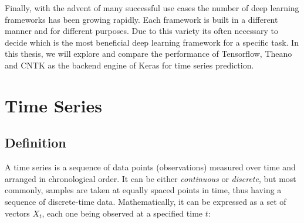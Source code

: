 \documentclass[a4paper, 12pt]{article}
\numberwithin{equation}{section}
\numberwithin{figure}{section}
\numberwithin{table}{section}
\begin{document}
	Finally, with the advent of many successful use cases the number of deep learning frameworks has been growing rapidly. Each framework is built in a different manner and for different purposes. Due to this variety its often necessary to decide which is the most beneficial deep learning framework for a specific task. In this thesis, we will explore and compare the performance of Tensorflow, Theano and CNTK as the backend engine of Keras for time series prediction.
	
	\newpage
	
	
%	
	
	
	\section{Time Series}
	
	\subsection{Definition}
	
	A time series is a sequence of data points (observations) measured over time and arranged in chronological order. It can be either \textit{continuous} or \textit{discrete}, but most commonly, samples are taken at equally spaced points in time, thus having a sequence of discrete-time data. Mathematically, it can be expressed as a set of vectors $X_t$, each one being observed at a specified time $t$:
	
\end{document}
